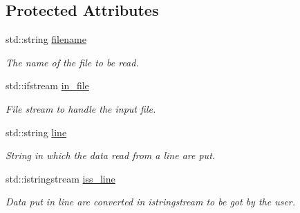 \subsection*{Protected Attributes}
\begin{DoxyCompactItemize}
\item 
\hypertarget{classnew__reader__class_a9dcdd31bf0f8ae62cb7e5de0ef10c0f8}{
std::string \hyperlink{classnew__reader__class_a9dcdd31bf0f8ae62cb7e5de0ef10c0f8}{filename}}
\label{classnew__reader__class_a9dcdd31bf0f8ae62cb7e5de0ef10c0f8}

\begin{DoxyCompactList}\small\item\em The name of the file to be read. \item\end{DoxyCompactList}\item 
\hypertarget{classnew__reader__class_a015e6a646a92851042775e0211752a9e}{
std::ifstream \hyperlink{classnew__reader__class_a015e6a646a92851042775e0211752a9e}{in\_\-file}}
\label{classnew__reader__class_a015e6a646a92851042775e0211752a9e}

\begin{DoxyCompactList}\small\item\em File stream to handle the input file. \item\end{DoxyCompactList}\item 
\hypertarget{classnew__reader__class_a285a324c64b881c8cbcfb507c54af0bd}{
std::string \hyperlink{classnew__reader__class_a285a324c64b881c8cbcfb507c54af0bd}{line}}
\label{classnew__reader__class_a285a324c64b881c8cbcfb507c54af0bd}

\begin{DoxyCompactList}\small\item\em String in which the data read from a line are put. \item\end{DoxyCompactList}\item 
\hypertarget{classnew__reader__class_afd7ac3583e064f6164567d6b09c1d960}{
std::istringstream \hyperlink{classnew__reader__class_afd7ac3583e064f6164567d6b09c1d960}{iss\_\-line}}
\label{classnew__reader__class_afd7ac3583e064f6164567d6b09c1d960}

\begin{DoxyCompactList}\small\item\em Data put in line are converted in istringstream to be got by the user. \item\end{DoxyCompactList}\end{DoxyCompactItemize}



